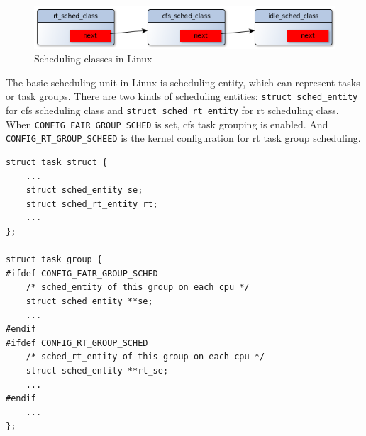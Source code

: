 \begin{figure}[htbp]
        \centering
        \includegraphics[width=\textwidth]{images/sched_classes}
        \caption{Scheduling classes in Linux}
        \label{fig:sched_classes}
\end{figure}
The basic scheduling unit in Linux is scheduling entity, which can represent
tasks or task groups. There are two kinds of scheduling entities:
\texttt{struct sched\_entity} for cfs scheduling class and 
\texttt{struct sched\_rt\_entity} for rt scheduling class.
When \texttt{CONFIG\_FAIR\_GROUP\_SCHED} is set, cfs task grouping 
is enabled. And \texttt{CONFIG\_RT\_GROUP\_SCHEED} is the kernel configuration
for rt task group scheduling.
\begin{lstlisting}
struct task_struct {
	...
	struct sched_entity se;
	struct sched_rt_entity rt;
	...
};

struct task_group {
#ifdef CONFIG_FAIR_GROUP_SCHED
	/* sched_entity of this group on each cpu */
	struct sched_entity **se;
	...
#endif
#ifdef CONFIG_RT_GROUP_SCHED
	/* sched_rt_entity of this group on each cpu */
	struct sched_entity **rt_se;
	...
#endif
	...
};
\end{lstlisting}

